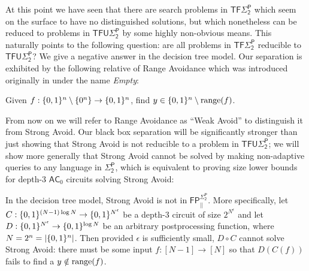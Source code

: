 At this point we have seen that there are search problems in $\mathsf{TF\Sigma_2^P}$ which seem on the surface to have no distinguished solutions, but which nonetheless can be reduced to problems in $\mathsf{TFU\Sigma_2^P}$ by some highly non-obvious means. This naturally points to the following question: are all problems in $\mathsf{TF\Sigma_2^P}$ reducible to $\mathsf{TFU\Sigma_2^P}$? We give a negative answer in the decision tree model. Our separation is exhibited by the following relative of Range Avoidance which was introduced originally in \cite{KKMP} under the name \emph{Empty}:
\begin{definition}
Given $f: \{0,1\}^n \setminus \{0^n\} \to \{0,1\}^n$, find $y \in \{0,1\}^n \setminus \mathrm{range}(f)$.
\end{definition}
From now on we will refer to Range Avoidance as ``Weak Avoid'' to distinguish it from Strong Avoid. Our black box separation will be significantly stronger than just showing that Strong Avoid is not reducible to a problem in $\mathsf{TFU\Sigma_2^P}$; we will show more generally that Strong Avoid cannot be solved by making non-adaptive queries to any language in $\mathsf{\Sigma_2^P}$, which is equivalent to proving size lower bounds for depth-3 $\mathsf{AC}_0$ circuits solving Strong Avoid: 

\begin{theorem}

In the decision tree model, Strong Avoid is not in $\mathsf{FP_{||}^{\Sigma_2^P}}$. More specifically, let ${C:\{0,1\}^{(N-1) \log N } \to \{0,1\}^{N^{\epsilon}}}$ be a depth-3 circuit of size $2^{N^{\epsilon}}$  and let $D: \{0,1\}^{N^{\epsilon}} \to \{0,1\}^{ \log N}$ be an arbitrary postprocessing function, where $N=2^n = |\{0,1\}^n|$. Then provided $\epsilon$ is sufficiently small, $D \circ C$ cannot solve Strong Avoid: there must be some input $f: [N-1] \to [N]$ so that $D(C(f))$ fails to find a $y \notin \mathrm{range}(f)$.
\end{theorem}

